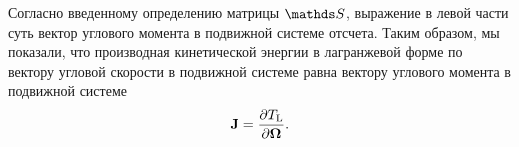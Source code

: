 \begin{subappendices}
    Согласно введенному определению матрицы $\bbS$, выражение в левой части суть вектор углового момента в подвижной системе отсчета. Таким образом, мы показали, что производная кинетической энергии в лагранжевой форме по вектору угловой скорости в подвижной системе равна вектору углового момента в подвижной системе
    \begin{gather}
        \mathbf{J} = \frac{\partial T_\text{L}}{\partial \boldsymbol{\Omega}}.
    \end{gather}
    
\end{subappendices}
